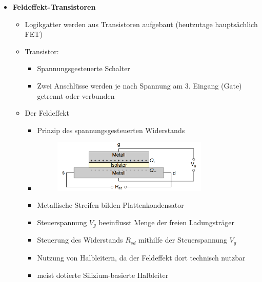 \documentclass[11pt,a4paper]{article}
\begin{document}
\begin{itemize}
\item \textbf{Feldeffekt-Transistoren}
	\begin{itemize}
	\item Logikgatter werden aus Transistoren aufgebaut (heutzutage hauptsächlich FET)
	\item Transistor: 
		\begin{itemize}
		\item Spannungsgesteuerte Schalter
		\item Zwei Anschlüsse werden je nach Spannung am 3. Eingang (Gate) getrennt oder verbunden
		\end{itemize}			
	\item Der Feldeffekt
		\begin{itemize}
		\item Prinzip des spannungsgesteuerten Widerstands
		\item[] \begin{figure}[H]
				\begin{center}
				\includegraphics[height=2.5cm]{feldeffekt}
				\end{center}
				\end{figure}
		\item Metallische Streifen bilden Plattenkondensator
		\item Steuerspannung $V_g$ beeinflusst Menge der freien Ladungsträger
		\item Steuerung des Widerstands $R_{sd}$ mithilfe der Steuerspannung $V_g$ 
		\item Nutzung von Halbleitern, da der Feldeffekt dort technisch nutzbar
		\item meist dotierte Silizium-basierte Halbleiter
		\end{itemize}
		

\end{itemize}
\end{itemize}
\end{document}
